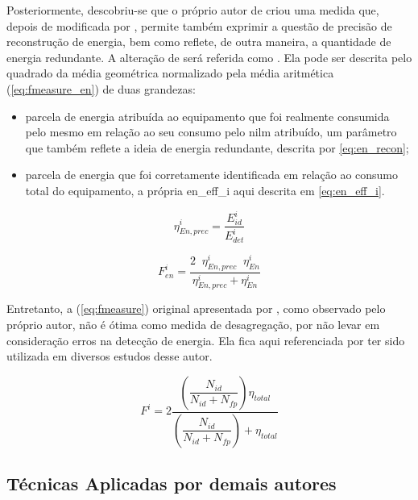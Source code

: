 Posteriormente, descobriu-se que o próprio autor de
\cite{nilm_zeifman_review_2011} criou uma medida que, depois de
modificada por \cite{seminilm_fhmm_empiricalnmeter_2013}, permite
também exprimir a questão de precisão de reconstrução de energia, bem
como reflete, de outra maneira, a quantidade de energia redundante. 
A alteração de \cite{seminilm_fhmm_empiricalnmeter_2013} será referida
como .
Ela pode ser descrita pelo quadrado da média geométrica normalizado
pela média aritmética (\ref{eq:fmeasure_en}) de duas grandezas: 

\begin{itemize}
\item parcela de energia atribuída ao equipamento que foi realmente
consumida pelo mesmo em relação ao seu consumo pelo \gls{nilm}
atribuído, um parâmetro que também reflete a ideia de energia
redundante, descrita por \ref{eq:en_recon};
\item parcela de energia que foi corretamente identificada em relação
ao consumo total do equipamento, a própria \gls{en_eff_i} aqui descrita
em \ref{eq:en_eff_i}.
\end{itemize}

\begin{equation}\label{eq:en_recon}
\eta_{En,prec}^i = \frac{E_{id}^i}{E_{det}^i}
\end{equation}

\begin{equation}\label{eq:fmeasure_en}
F_{en}^i=\frac{2 \;\; \eta_{En,prec}^i \;\; \eta_{En}^i}{\eta_{En,prec}^i+\eta_{En}^i}
\end{equation}

Entretanto, a  (\ref{eq:fmeasure}) original
apresentada por \citet*{nilm_zeifman_vastext_approach_2012}, como
observado pelo próprio autor, não é ótima como medida de desagregação,
por não levar em consideração erros na detecção de energia. Ela fica
aqui referenciada por ter sido utilizada em diversos estudos desse
autor.

\begin{equation}\label{eq:fmeasure}
F^i=2\dfrac{\left(\dfrac{N_{id}}{N_{id}+N_{fp}}\right)\eta_{total}}
{\left(\dfrac{N_{id}}{N_{id}+N_{fp}}\right)+\eta_{total}}
\end{equation}


\subsection{Técnicas Aplicadas por demais autores}
\label{ssec:nilm_tecnicas}

